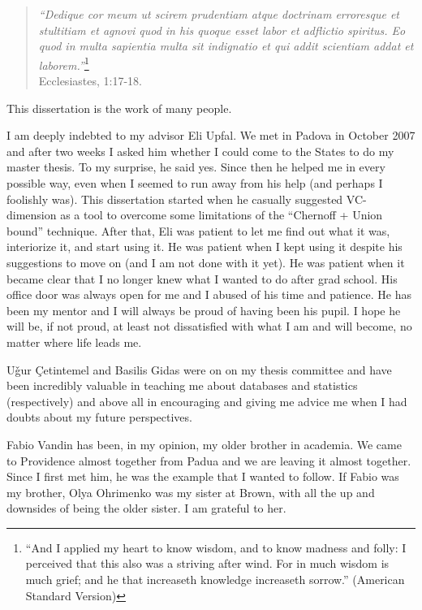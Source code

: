 \begin{quote}
\begin{flushright}
  {\em ``Dedique cor meum ut scirem prudentiam atque doctrinam erroresque et
  stultitiam et agnovi quod in his quoque esset labor et adflictio spiritus. Eo
  quod in multa sapientia multa sit indignatio et qui addit scientiam addat et
  laborem.''}\footnote{``And I applied my heart to know wisdom, and to know madness
  and folly: I perceived that this also was a striving after wind. For in much
  wisdom is much grief; and he that increaseth knowledge increaseth sorrow.'' 
  (American Standard Version)}\\Ecclesiastes, 1:17-18.
\end{flushright}
\end{quote}

This dissertation is the work of many people.

I am deeply indebted to my advisor Eli Upfal. We met in Padova in October 2007
and after two weeks I asked him whether I could come to the States to do my
master thesis. To my surprise, he said yes. Since then he helped me in every 
possible way, even when I seemed to run away from his help (and perhaps I
foolishly was). This dissertation started when he casually suggested
VC-dimension as a tool to overcome some limitations of the ``Chernoff + Union
bound'' technique. After that, Eli was patient to let me find out what it was,
interiorize it, and start using it. He was patient when I kept using it despite
his suggestions to move on (and I am not done with it yet). He was patient when
it became clear that I no longer knew what I wanted to do after grad school. His
office door was always open for me and I abused of his time and patience. He has
been my mentor and I will always be proud of having been his pupil. I hope he
will be, if not proud, at least not dissatisfied with what I am and will become,
no matter where life leads me.  

U\v{g}ur \c{C}etintemel and Basilis Gidas were on on my thesis committee and have
been incredibly valuable in teaching me about databases and statistics
(respectively) and above all in encouraging and giving me advice me when I had
doubts about my future perspectives.

Fabio Vandin has been, in my opinion, my older brother in academia. We came to
Providence almost together from Padua and we are leaving it almost together.
Since I first met him, he was the example that I wanted to follow. If Fabio was
my brother, Olya Ohrimenko was my sister at Brown, with all the up and downsides
of being the older sister. I am grateful to her.

